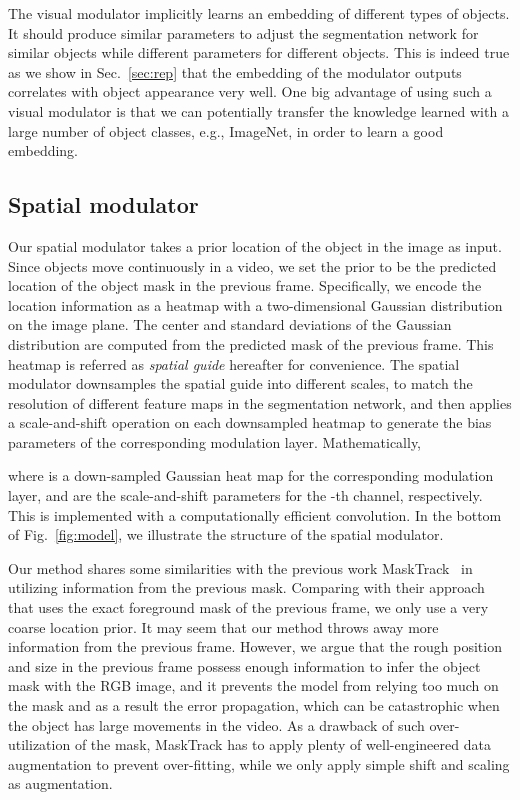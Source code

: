 \documentclass[10pt,twocolumn,letterpaper]{article}
\begin{document}
The visual modulator implicitly learns an embedding of different types of objects. It should produce similar parameters to adjust the segmentation network for similar objects while different parameters for different objects. This is indeed true as we show in Sec.~\ref{sec:rep} that the embedding of the modulator outputs correlates with object appearance very well. One big advantage of using such a visual modulator is that we can potentially transfer the knowledge learned with a large number of object classes, e.g., ImageNet, in order to learn a good embedding.



\subsection{Spatial modulator}

Our spatial modulator takes a prior location of the object in the image as input. Since objects move continuously in a video, we set the prior to be the predicted location of the object mask in the previous frame. Specifically, we encode the location information as a heatmap with a two-dimensional Gaussian distribution on the image plane. The center and standard deviations of the Gaussian distribution are computed from the predicted mask of the previous frame. This heatmap is referred as \emph{spatial guide} hereafter for convenience. The spatial modulator downsamples the spatial guide into different scales, to match the resolution of different feature maps in the segmentation network, and then applies a scale-and-shift operation on each downsampled heatmap to generate the bias parameters of the corresponding modulation layer. Mathematically,

where  is a down-sampled Gaussian heat map for the corresponding modulation layer,  and  are the scale-and-shift parameters for the -th channel, respectively. This is implemented with a computationally efficient  convolution. In the bottom of Fig.~\ref{fig:model}, we illustrate the structure of the spatial modulator.

Our method shares some similarities with the previous work MaskTrack~\cite{Perazzi2017masktrack} in utilizing information from the previous mask. Comparing with their approach that uses the exact foreground mask of the previous frame, we only use a very coarse location prior. It may seem that our method throws away more information from the previous frame. However, we argue that the rough position and size in the previous frame possess enough information to infer the object mask with the RGB image, and it prevents the model from relying too much on the mask and as a result the error propagation, which can be catastrophic when the object has large movements in the video. As a drawback of such over-utilization of the mask, MaskTrack has to apply plenty of well-engineered data augmentation to prevent over-fitting, while we only apply simple shift and scaling as augmentation. 
\end{document}
